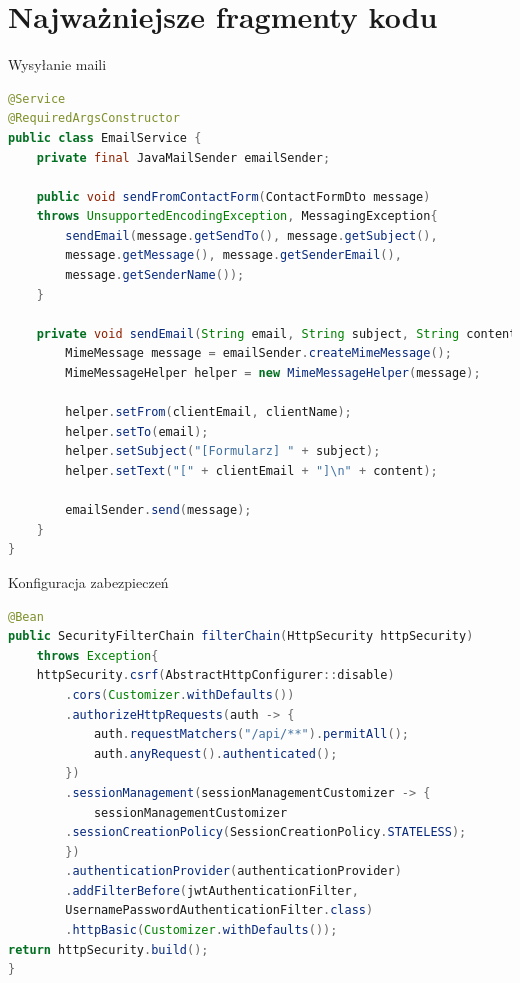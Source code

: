 \documentclass[12pt]{article}
\begin{document}
\section{Najważniejsze fragmenty kodu}
Wysyłanie maili
\begin{lstlisting}[language=Java]
@Service
@RequiredArgsConstructor
public class EmailService {
    private final JavaMailSender emailSender;

    public void sendFromContactForm(ContactFormDto message) 
    throws UnsupportedEncodingException, MessagingException{
        sendEmail(message.getSendTo(), message.getSubject(), 
        message.getMessage(), message.getSenderEmail(), 
        message.getSenderName());
    }

    private void sendEmail(String email, String subject, String content, String clientEmail, String clientName)throws MessagingException, UnsupportedEncodingException {
        MimeMessage message = emailSender.createMimeMessage();
        MimeMessageHelper helper = new MimeMessageHelper(message);

        helper.setFrom(clientEmail, clientName);
        helper.setTo(email);
        helper.setSubject("[Formularz] " + subject);
        helper.setText("[" + clientEmail + "]\n" + content);
        
        emailSender.send(message);
    }
}
\end{lstlisting}
\newpage
Konfiguracja zabezpieczeń
\begin{lstlisting}[language=Java]
@Bean
public SecurityFilterChain filterChain(HttpSecurity httpSecurity) 
    throws Exception{
    httpSecurity.csrf(AbstractHttpConfigurer::disable)
        .cors(Customizer.withDefaults())
        .authorizeHttpRequests(auth -> {
            auth.requestMatchers("/api/**").permitAll();
            auth.anyRequest().authenticated();
        })
        .sessionManagement(sessionManagementCustomizer -> {
            sessionManagementCustomizer
        .sessionCreationPolicy(SessionCreationPolicy.STATELESS);
        })
        .authenticationProvider(authenticationProvider)
        .addFilterBefore(jwtAuthenticationFilter, 
        UsernamePasswordAuthenticationFilter.class)
        .httpBasic(Customizer.withDefaults());
return httpSecurity.build();
}
\end{lstlisting}
\end{document}
